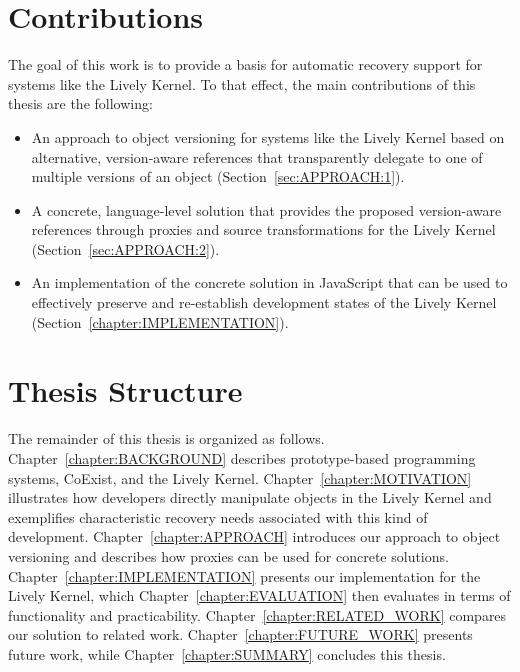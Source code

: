 \section{Contributions}

The goal of this work is to provide a basis for automatic recovery support for systems like the Lively Kernel.
To that effect, the main contributions of this thesis are the following:

\begin{itemize}
    \item An approach to object versioning for systems like the Lively Kernel based on alternative, version-aware references that transparently delegate to one of multiple versions of an object (Section~\ref{sec:APPROACH:1}).
    \item A concrete, language-level solution that provides the proposed version-aware references through proxies and source transformations for the Lively Kernel (Section~\ref{sec:APPROACH:2}).
    \item An implementation of the concrete solution in JavaScript that can be used to effectively preserve and re-establish development states of the Lively Kernel (Section~\ref{chapter:IMPLEMENTATION}).
\end{itemize}


\section{Thesis Structure}

The remainder of this thesis is organized as follows. 
Chapter~\ref{chapter:BACKGROUND} describes prototype-based programming systems, CoExist, and the Lively Kernel.
Chapter~\ref{chapter:MOTIVATION} illustrates how developers directly manipulate objects in the Lively Kernel and exemplifies characteristic recovery needs associated with this kind of development.
Chapter~\ref{chapter:APPROACH} introduces our approach to object versioning and describes how proxies can be used for concrete solutions.
Chapter~\ref{chapter:IMPLEMENTATION} presents our implementation for the Lively Kernel, which Chapter~\ref{chapter:EVALUATION} then evaluates in terms of functionality and practicability.
Chapter~\ref{chapter:RELATED_WORK} compares our solution to related work.
Chapter~\ref{chapter:FUTURE_WORK} presents future work, while Chapter~\ref{chapter:SUMMARY} concludes this thesis.

